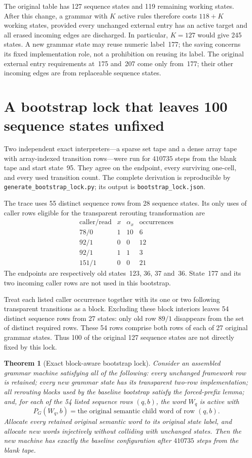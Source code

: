 \documentclass[11pt]{article}
\newtheorem{theorem}[lemma]{Theorem}
\newcommand{\Word}[1]{W_{#1}}
\begin{document}
The original table has 127 sequence states and 119 remaining working states.
After this change, a grammar with $K$ active rules therefore costs
$118+K$ working states, provided every unchanged external entry has an active
target and all erased incoming edges are discharged. In particular, $K=127$
would give 245 states. A new grammar state may reuse numeric label~177;
the saving concerns its fixed implementation role, not a prohibition on
reusing its label. The original external entry requirements at~175 and~207
come only from~177; their other incoming edges are from replaceable sequence
states.

\section{A bootstrap lock that leaves 100 sequence states unfixed}

Two independent exact interpreters---a sparse set tape and a dense array
tape with array-indexed transition rows---were run for $410735$ steps from
the blank tape and start state~95. They agree on the endpoint, every
surviving one-cell, and every used transition count. The complete derivation
is reproducible by \texttt{generate\_bootstrap\_lock.py}; its output is
\texttt{bootstrap\_lock.json}.

The trace uses 55 distinct sequence rows from 28 sequence states. Its only
uses of caller rows eligible for the transparent rerouting transformation are
\[
\begin{array}{c|c|c|r}
\text{caller/read}&x&\alpha_x&\text{occurrences}\\\hline
78/0&1&10&6\\
92/1&0&0&12\\
92/1&1&1&3\\
151/1&0&0&21
\end{array}
\]
The endpoints are respectively old states~123, 36, 37 and~36. State~177
and its two incoming caller rows are not used in this bootstrap.

Treat each listed caller occurrence together with its one or two following
transparent transitions as a block. Excluding these block interiors leaves
54 distinct sequence rows from 27 states: only old row $89/1$ disappears
from the set of distinct required rows. These 54 rows comprise both rows of
each of 27 original grammar states. Thus 100 of the original 127 sequence
states are not directly fixed by this lock.

\begin{theorem}[Exact block-aware bootstrap lock]
Consider an assembled grammar machine satisfying all of the following:
every unchanged framework row is retained; every new grammar state has its
transparent two-row implementation; all rerouting blocks used by the
baseline bootstrap satisfy the forced-prefix lemma; and, for each of the
54 listed sequence rows $(q,b)$, the word $\Word q$ is active with
\[
 P_G(\Word q,b)=\text{the original semantic child word of row }(q,b).
\]
Allocate every retained original semantic word to its original state label,
and allocate new words injectively without colliding with unchanged states.
Then the new machine has exactly the baseline configuration after $410735$
steps from the blank tape.
\end{theorem}
\end{document}
